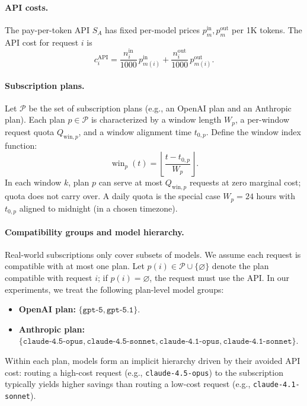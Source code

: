 \documentclass[11pt]{article}
\begin{document}
\paragraph{API costs.}
The pay-per-token API \(S_A\) has fixed per-model prices \(p_m^{\text{in}}, p_m^{\text{out}}\) per 1K tokens. The API cost for request \(i\) is
\[
  c_i^{\text{API}} = \frac{n_i^{\text{in}}}{1000}\,p_{m(i)}^{\text{in}} + \frac{n_i^{\text{out}}}{1000}\,p_{m(i)}^{\text{out}}.
\]

\paragraph{Subscription plans.}
Let \(\mathcal{P}\) be the set of subscription plans (e.g., an OpenAI plan and an Anthropic plan).
Each plan \(p \in \mathcal{P}\) is characterized by a window length \(W_p\), a per-window request quota \(Q_{\text{win},p}\), and a window alignment time \(t_{0,p}\).
Define the window index function:
\[
  \operatorname{win}_p(t) = \left\lfloor \frac{t - t_{0,p}}{W_p} \right\rfloor.
\]
In each window \(k\), plan \(p\) can serve at most \(Q_{\text{win},p}\) requests at zero marginal cost; quota does not carry over.
A daily quota is the special case \(W_p = 24\) hours with \(t_{0,p}\) aligned to midnight (in a chosen timezone).

\paragraph{Compatibility groups and model hierarchy.}
Real-world subscriptions only cover subsets of models. We assume each request is compatible with at most one plan.
Let \(p(i) \in \mathcal{P} \cup \{\varnothing\}\) denote the plan compatible with request \(i\); if \(p(i)=\varnothing\), the request must use the API.
In our experiments, we treat the following plan-level model groups:
\begin{itemize}
  \item \textbf{OpenAI plan:} \(\{ \texttt{gpt-5}, \texttt{gpt-5.1} \}\).
  \item \textbf{Anthropic plan:} \(\{ \texttt{claude-4.5-opus}, \texttt{claude-4.5-sonnet}, \texttt{claude-4.1-opus}, \texttt{claude-4.1-sonnet} \}\).
\end{itemize}
Within each plan, models form an implicit hierarchy driven by their avoided API cost: routing a high-cost request (e.g., \texttt{claude-4.5-opus}) to the subscription typically yields higher savings than routing a low-cost request (e.g., \texttt{claude-4.1-sonnet}).
\end{document}

